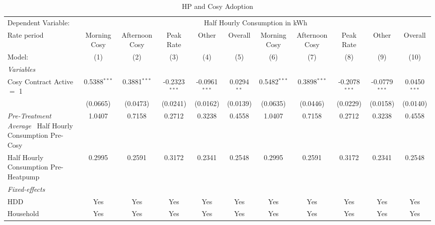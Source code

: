 
\begin{table}[htbp]
   \caption{\label{tab:did-hp-install-overall} HP and Cosy Adoption}
   \centering
   \begin{tabular}{lcccccccccc}
      \tabularnewline \midrule \midrule
      Dependent Variable: & \multicolumn{10}{c}{Half Hourly Consumption in kWh}\\
      Rate period                          & Morning Cosy   & Afternoon Cosy & Peak Rate       & Other           & Overall       & Morning Cosy   & Afternoon Cosy & Peak Rate       & Other           & Overall \\   
      Model:                               & (1)            & (2)            & (3)             & (4)             & (5)           & (6)            & (7)            & (8)             & (9)             & (10)\\  
      \midrule
      \emph{Variables}\\
      Cosy Contract Active $=$ 1           & 0.5388$^{***}$ & 0.3881$^{***}$ & -0.2323$^{***}$ & -0.0961$^{***}$ & 0.0294$^{**}$ & 0.5482$^{***}$ & 0.3898$^{***}$ & -0.2078$^{***}$ & -0.0779$^{***}$ & 0.0450$^{***}$\\   
                                           & (0.0665)       & (0.0473)       & (0.0241)        & (0.0162)        & (0.0139)      & (0.0635)       & (0.0446)       & (0.0229)        & (0.0158)        & (0.0140)\\   
      \midrule
\emph{Pre-Treatment Average}\
\midrule
      Half Hourly Consumption Pre-Cosy     & 1.0407         & 0.7158         & 0.2712          & 0.3238          & 0.4558        & 1.0407         & 0.7158         & 0.2712          & 0.3238          & 0.4558\\  
      Half Hourly Consumption Pre-Heatpump & 0.2995         & 0.2591         & 0.3172          & 0.2341          & 0.2548        & 0.2995         & 0.2591         & 0.3172          & 0.2341          & 0.2548\\  
      \emph{Fixed-effects}\\
      HDD                                  & Yes            & Yes            & Yes             & Yes             & Yes           & Yes            & Yes            & Yes             & Yes             & Yes\\  
      Household                            & Yes            & Yes            & Yes             & Yes             & Yes           & Yes            & Yes            & Yes             & Yes             & Yes\\  

\end{tabular}
\end{table}
